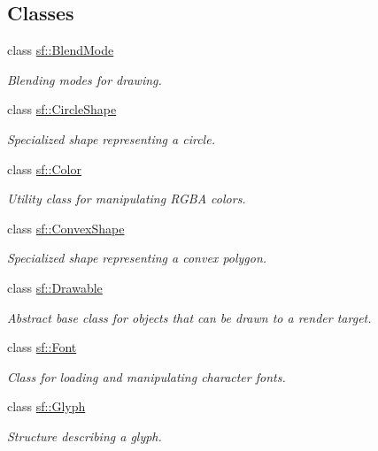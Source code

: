 \subsection*{Classes}
\begin{DoxyCompactItemize}
\item 
class \mbox{\hyperlink{structsf_1_1_blend_mode}{sf\+::\+Blend\+Mode}}
\begin{DoxyCompactList}\small\item\em Blending modes for drawing. \end{DoxyCompactList}\item 
class \mbox{\hyperlink{classsf_1_1_circle_shape}{sf\+::\+Circle\+Shape}}
\begin{DoxyCompactList}\small\item\em Specialized shape representing a circle. \end{DoxyCompactList}\item 
class \mbox{\hyperlink{classsf_1_1_color}{sf\+::\+Color}}
\begin{DoxyCompactList}\small\item\em Utility class for manipulating R\+G\+BA colors. \end{DoxyCompactList}\item 
class \mbox{\hyperlink{classsf_1_1_convex_shape}{sf\+::\+Convex\+Shape}}
\begin{DoxyCompactList}\small\item\em Specialized shape representing a convex polygon. \end{DoxyCompactList}\item 
class \mbox{\hyperlink{classsf_1_1_drawable}{sf\+::\+Drawable}}
\begin{DoxyCompactList}\small\item\em Abstract base class for objects that can be drawn to a render target. \end{DoxyCompactList}\item 
class \mbox{\hyperlink{classsf_1_1_font}{sf\+::\+Font}}
\begin{DoxyCompactList}\small\item\em Class for loading and manipulating character fonts. \end{DoxyCompactList}\item 
class \mbox{\hyperlink{classsf_1_1_glyph}{sf\+::\+Glyph}}
\begin{DoxyCompactList}\small\item\em Structure describing a glyph. \end{DoxyCompactList}\item 

\end{DoxyCompactItemize}
